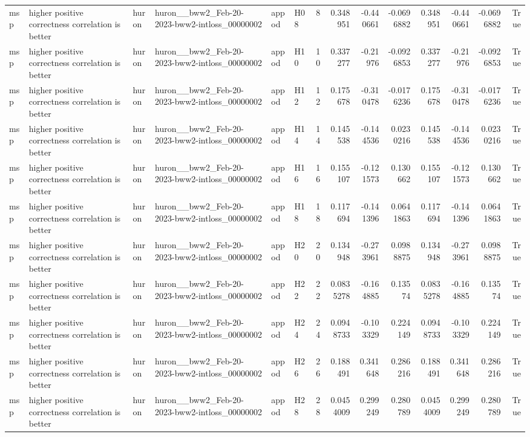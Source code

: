 \begin{longtable}{llllllrrrrrrrr}
msp & higher positive correctness correlation is better & huron & huron\_\_bww2\_Feb-20-2023-bww2-intloss\_00000002 & appod & H08 & 8 & 0.348951 & -0.440661 & -0.0696882 & 0.348951 & -0.440661 & -0.0696882 & True \\
msp & higher positive correctness correlation is better & huron & huron\_\_bww2\_Feb-20-2023-bww2-intloss\_00000002 & appod & H10 & 10 & 0.337277 & -0.21976 & -0.0926853 & 0.337277 & -0.21976 & -0.0926853 & True \\
msp & higher positive correctness correlation is better & huron & huron\_\_bww2\_Feb-20-2023-bww2-intloss\_00000002 & appod & H12 & 12 & 0.175678 & -0.310478 & -0.0176236 & 0.175678 & -0.310478 & -0.0176236 & True \\
msp & higher positive correctness correlation is better & huron & huron\_\_bww2\_Feb-20-2023-bww2-intloss\_00000002 & appod & H14 & 14 & 0.145538 & -0.144536 & 0.0230216 & 0.145538 & -0.144536 & 0.0230216 & True \\
msp & higher positive correctness correlation is better & huron & huron\_\_bww2\_Feb-20-2023-bww2-intloss\_00000002 & appod & H16 & 16 & 0.155107 & -0.121573 & 0.130662 & 0.155107 & -0.121573 & 0.130662 & True \\
msp & higher positive correctness correlation is better & huron & huron\_\_bww2\_Feb-20-2023-bww2-intloss\_00000002 & appod & H18 & 18 & 0.117694 & -0.141396 & 0.0641863 & 0.117694 & -0.141396 & 0.0641863 & True \\
msp & higher positive correctness correlation is better & huron & huron\_\_bww2\_Feb-20-2023-bww2-intloss\_00000002 & appod & H20 & 20 & 0.134948 & -0.273961 & 0.0988875 & 0.134948 & -0.273961 & 0.0988875 & True \\
msp & higher positive correctness correlation is better & huron & huron\_\_bww2\_Feb-20-2023-bww2-intloss\_00000002 & appod & H22 & 22 & 0.0835278 & -0.164885 & 0.13574 & 0.0835278 & -0.164885 & 0.13574 & True \\
msp & higher positive correctness correlation is better & huron & huron\_\_bww2\_Feb-20-2023-bww2-intloss\_00000002 & appod & H24 & 24 & 0.0948733 & -0.103329 & 0.224149 & 0.0948733 & -0.103329 & 0.224149 & True \\
msp & higher positive correctness correlation is better & huron & huron\_\_bww2\_Feb-20-2023-bww2-intloss\_00000002 & appod & H26 & 26 & 0.188491 & 0.341648 & 0.286216 & 0.188491 & 0.341648 & 0.286216 & True \\
msp & higher positive correctness correlation is better & huron & huron\_\_bww2\_Feb-20-2023-bww2-intloss\_00000002 & appod & H28 & 28 & 0.0454009 & 0.299249 & 0.280789 & 0.0454009 & 0.299249 & 0.280789 & True \\

\end{longtable}
